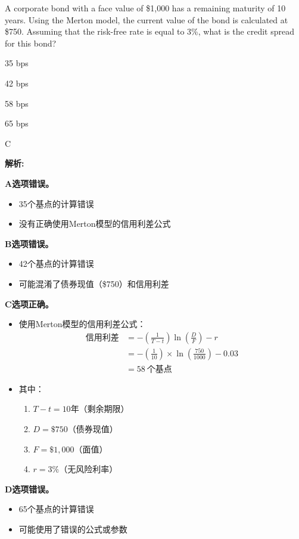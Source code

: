 \documentclass{article}
\newcounter{question} %
\newenvironment{explanation}
{\textbf{解析:}\par}
{\par}
\begin{document}
\begin{question}
    A corporate bond with a face value of \$1,000 has a remaining maturity of 10 years. Using the Merton model, the current value of the bond is calculated at \$750. Assuming that the risk-free rate is equal to 3\%, what is the credit spread for this bond?
\end{question}

\begin{choices}
    \item 35 bps
    \item 42 bps
    \item 58 bps
    \item 65 bps
\end{choices}

\begin{correctanswer}
    C
\end{correctanswer}

\begin{explanation}
    \textbf{A选项错误。}
    \begin{itemize}
        \item 35个基点的计算错误
        \item 没有正确使用Merton模型的信用利差公式
    \end{itemize}
    
    \textbf{B选项错误。}
    \begin{itemize}
        \item 42个基点的计算错误
        \item 可能混淆了债券现值（\$750）和信用利差
    \end{itemize}
    
    \textbf{C选项正确。}
    \begin{itemize}
        \item 使用Merton模型的信用利差公式：
        \[
        \begin{aligned}
        \text{信用利差} &= -\left(\frac{1}{T-t}\right) \ln\left(\frac{D}{F}\right) - r \\
        &= -\left(\frac{1}{10}\right) \times \ln\left(\frac{750}{1000}\right) - 0.03 \\
        &= 58\ \text{个基点}
        \end{aligned}
        \]
        \item 其中：
        \begin{enumerate}
            \item $T-t = 10$年（剩余期限）
            \item $D = \$750$（债券现值）
            \item $F = \$1,000$（面值）
            \item $r = 3\%$（无风险利率）
        \end{enumerate}
    \end{itemize}
    
    \textbf{D选项错误。}
    \begin{itemize}
        \item 65个基点的计算错误
        \item 可能使用了错误的公式或参数
    \end{itemize}
\end{explanation}
\end{document}
